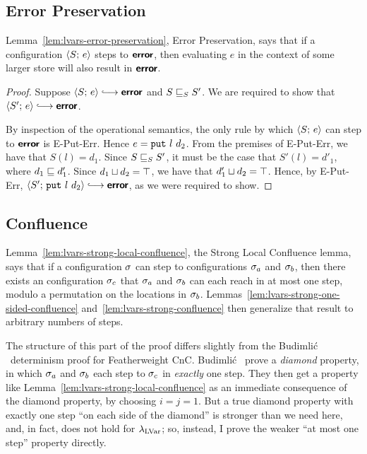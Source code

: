 \subsection{Error Preservation}

Lemma~\ref{lem:lvars-error-preservation}, Error Preservation, says
that if a configuration $\langle S;\, e \rangle$ steps to $\textbf{\textsf{error}}$, then
evaluating $e$ in the context of some larger store will also result in
$\textbf{\textsf{error}}$.

\LVarsLemErrorPreservation
\begin{proof}
  Suppose $\config{S}{e} \parstepsto \error$ and
  $S \sqsubseteq_S S'$. We are required to show that $\config{S'}{e}
  \parstepsto \textup{\error}$.

  By inspection of the operational semantics, the only rule by which
  $\langle S;\, e \rangle$ can step to $\textbf{\textsf{error}}$ is {\sc E-Put-Err}.  Hence $e =
  \mbox{\texttt{put}}~l~d_2$.  From the premises of {\sc E-Put-Err}, we have
  that $S(l) = d_1$.  Since $S \sqsubseteq_S S'$, it must be the case
  that $S'(l) = d'_1$, where $d_1 \sqsubseteq d'_1$.  Since
  $d_1 \sqcup d_2 = \top$, we have that $d'_1 \sqcup d_2 =
  \top$.  Hence, by {\sc E-Put-Err}, $\config{S'}{\putexp{l}{d_2}}
  \parstepsto \error$, as we were required to show.
\end{proof}

\subsection{Confluence}\label{subsection:lvars-confluence}

Lemma~\ref{lem:lvars-strong-local-confluence}, the Strong Local
Confluence lemma, says that if a configuration $\sigma$ can step to
configurations $\sigma_a$ and $\sigma_b$, then there exists an
configuration $\sigma_c$ that $\sigma_a$ and $\sigma_b$ can each reach in
at most one step, modulo a permutation on the locations in $\sigma_b$.
Lemmas~\ref{lem:lvars-strong-one-sided-confluence}
and~\ref{lem:lvars-strong-confluence} then generalize that result to
arbitrary numbers of steps.

The structure of this part of the proof differs slightly from the
Budimli\'c \etal~determinism proof for Featherweight CnC.  Budimli\'c
\etal~prove a \emph{diamond} property, in which $\sigma_a$ and
$\sigma_b$ each step to $\sigma_c$ in \emph{exactly} one step.  They
then get a property like Lemma~\ref{lem:lvars-strong-local-confluence}
as an immediate consequence of the diamond property, by choosing $i =
j = 1$.  But a true diamond property with exactly one step ``on each
side of the diamond'' is stronger than we need here, and, in fact,
does not hold for $\lambda_{\textrm{LVar}}$; so, instead, I prove the weaker ``at
most one step'' property directly.

